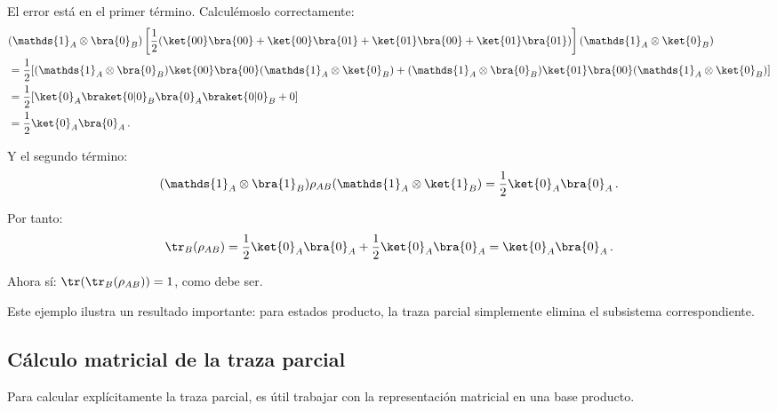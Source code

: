 \begin{eje}
  El error está en el primer término. Calculémoslo correctamente:
  \begin{align*}
     & (\mathds{1}_A \otimes \bra{0}_B)\left[\frac{1}{2}(\ket{00}\bra{00} + \ket{00}\bra{01} + \ket{01}\bra{00} + \ket{01}\bra{01})\right](\mathds{1}_A \otimes \ket{0}_B)                \\
     & = \frac{1}{2}[(\mathds{1}_A \otimes \bra{0}_B)\ket{00}\bra{00}(\mathds{1}_A \otimes \ket{0}_B) + (\mathds{1}_A \otimes \bra{0}_B)\ket{01}\bra{00}(\mathds{1}_A \otimes \ket{0}_B)] \\
     & = \frac{1}{2}[\ket{0}_A\braket{0|0}_B\bra{0}_A\braket{0|0}_B + 0]                                                                                                                  \\
     & = \frac{1}{2}\ket{0}_A\bra{0}_A\,.
  \end{align*}

  Y el segundo término:
  \[
    (\mathds{1}_A \otimes \bra{1}_B)\rho_{AB}(\mathds{1}_A \otimes \ket{1}_B) = \frac{1}{2}\ket{0}_A\bra{0}_A\,.
  \]

  Por tanto:
  \[
    \tr_B(\rho_{AB}) = \frac{1}{2}\ket{0}_A\bra{0}_A + \frac{1}{2}\ket{0}_A\bra{0}_A = \ket{0}_A\bra{0}_A\,.
  \]

  Ahora sí: $\tr(\tr_B(\rho_{AB})) = 1$, como debe ser.
\end{eje}

Este ejemplo ilustra un resultado importante: para estados producto, la traza parcial simplemente elimina el subsistema correspondiente.

\subsection{Cálculo matricial de la traza parcial}

Para calcular explícitamente la traza parcial, es útil trabajar con la representación matricial en una base producto.

